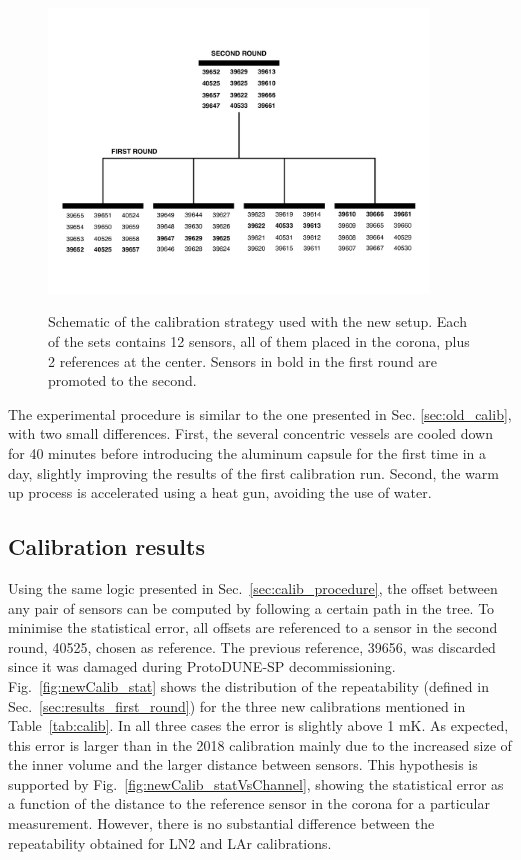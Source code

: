 \label{sec:newCalibrationStrategy}
\begin{figure}[htbp]
\centering
{\includegraphics[width=0.9\textwidth]{images/figure_16.pdf}}
\caption{Schematic of the calibration strategy used with the new setup. Each of the sets contains 12 sensors, all of them placed in the corona, plus 2 references at the center. Sensors in bold in the first round are promoted to the second.}
\label{fig:newCalibrationStrategy}
\end{figure}

The experimental procedure is similar to the one presented in Sec. \ref{sec:old_calib}, with two small differences. First, the several concentric vessels are cooled down for 40 minutes before introducing the aluminum capsule for the first time in a day, slightly improving the results of the first calibration run. Second, the warm up process is accelerated using a heat gun, avoiding the use of water.   

\subsection{Calibration results}
\label{sec:new_calib_results}

Using the same logic presented in Sec.~\ref{sec:calib_procedure}, the offset between any pair of sensors can be computed by following a certain path in the tree. To minimise the statistical error, all offsets are referenced to a sensor in the second round, 40525, chosen as reference. The previous reference, 39656, was discarded since it was damaged during ProtoDUNE-SP decommissioning. Fig.~\ref{fig:newCalib_stat} shows the distribution of the repeatability (defined in Sec.~\ref{sec:results_first_round}) for the three new calibrations mentioned in Table~\ref{tab:calib}. In all three cases the error is slightly above 1 mK. As expected, this error is larger than in the 2018 calibration mainly due to the increased size of the inner volume and the larger distance between sensors. This hypothesis is supported by Fig.~\ref{fig:newCalib_statVsChannel}, showing the statistical error as a function of the distance to the reference sensor in the corona for a particular measurement. However, there is no substantial difference between the repeatability obtained for LN2 and LAr calibrations.%

